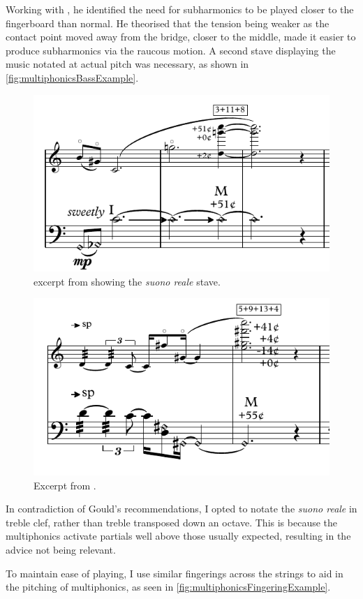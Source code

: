 Working with \bassParticipant, he identified the need for subharmonics to be played closer to the fingerboard than normal.
He theorised that the tension being weaker as the contact point moved away from the bridge, closer to the middle, made it easier to produce subharmonics via the raucous motion.\autocite[]{bloggsFeedbackContrabassSession2019}
A second stave displaying the music notated at actual pitch was necessary, as shown in \autoref{fig:multiphonicsBassExample}.
\begin{figure}
  \centering
  \includegraphics{./resources/multiphonicsBassExample.pdf}
  \caption{excerpt from \bassPiece\space showing the \emph{suono reale} stave.}\label{fig:multiphonicsBassExample}
\end{figure}
\begin{figure}
  \centering
  \includegraphics{./resources/multiphonicsFingeringExample.pdf}
  \caption{Excerpt from \bassPiece.}\label{fig:multiphonicsFingeringExample}
\end{figure}
In contradiction of Gould's recommendations, I opted to notate the \emph{suono reale} in treble clef, rather than treble transposed down an octave.\autocite[423]{gouldBars2011}
This is because the multiphonics activate partials well above those usually expected, resulting in the advice not being relevant.

To maintain ease of playing, I use similar fingerings across the strings to aid in the pitching of multiphonics, as seen in \autoref{fig:multiphonicsFingeringExample}.





